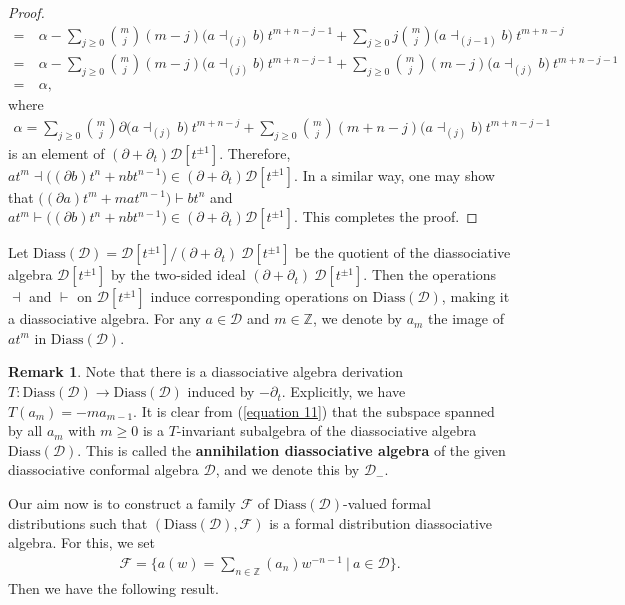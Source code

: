 \documentclass[a4paper,reqno,10pt]{amsart}
\theoremstyle{plain}
\theoremstyle{definition}
\newtheorem{remark}[thm]{Remark}
\theoremstyle{remark}
\newcommand{\Z}{\mathbb{Z}}
\newcommand{\D}{\mathcal{D}}
\newcommand{\p}{\partial}
\begin{document}
\begin{proof}
\begin{align*}
        =&~ \alpha  - \sum_{j \geq 0 } \binom{m}{j}   (m-j) \big(a \dashv_{(j)}  b \big) ~ \! t^{m+n-j-1 } +\sum_{j \geq 0 } j\binom{m}{j}   \big(  a \dashv_{(j-1)} b \big) ~ \! t^{m+n-j }\\
        =&~\alpha  - \sum_{j \geq 0 } \binom{m}{j}   (m-j) \big(a \dashv_{(j)}  b \big) ~ \! t^{m+n-j-1 } +\sum_{j \geq 0 } \binom{m}{j}   (m-j) \big(a \dashv_{(j)}  b \big) ~ \! t^{m+n-j-1 }\\
        =&~ \alpha,
    \end{align*}
    where 
    \begin{align*}
    \alpha = \sum \limits_{j \geq 0 } \binom{m}{j}   \p \big(a \dashv_{(j)}  b \big) ~ \! t^{m+n-j } +\sum \limits_{j \geq 0 } \binom{m}{j}   (m+n-j) \big(a \dashv_{(j)}  b \big) ~ \! t^{m+n-j -1} 
    \end{align*}
    is an element of $(\partial+\partial_t)\D[t^{\pm1}]$. Therefore, $at^m \dashv \big( (\p b)t^n + nbt^{n-1} \big) \in (\partial+\partial_t)\D[t^{\pm1}]$. In a similar way, one may show that $\big(  (\p a)t^{m} + mat^{m-1} \big)\vdash bt^{n} $ and $at^m \vdash \big( (\p b)t^n + nbt^{n-1} \big) \in (\partial+\partial_t)\D[t^{\pm1}]$. This completes the proof.
\end{proof}

Let $\mathrm{Diass} (\D) = \D[t^{\pm1}]\big/(\partial+\partial_t) ~ \! \D[t^{\pm1}]$ be the quotient of the diassociative algebra $ \D[t^{\pm1}]$ by the two-sided ideal $(\partial+\partial_t) ~ \! \D[t^{\pm1}]$.
Then the operations $\dashv$ and $\vdash$ on $\D[t^{\pm1}]$ induce corresponding
operations on $\mathrm{Diass} (\D)$, making it a diassociative algebra. For any $a\in \D$ and $m\in \Z$, we denote by $a_m$ the image of $at^m$ in $\mathrm{Diass} (\D)$. 

\begin{remark}\label{anni-di}
Note that there is a diassociative algebra derivation $T: \mathrm{Diass} (\D) \rightarrow \mathrm{Diass} (\D)$ induced by $-\p_t$. Explicitly, we have $T(a_m)= -ma_{m-1}$. It is clear from (\ref{equation 11}) that the subspace spanned by all $a_m$ with $m \geq 0$ is a $T$-invariant subalgebra of the diassociative algebra $\mathrm{Diass} (\D)$. This is called the {\bf annihilation diassociative algebra} of the given diassociative conformal algebra $\D$, and we denote this by $\D_{-}$. 
\end{remark}

 Our aim now is to construct a family $\mathcal{F}$ of $\mathrm{Diass} (\D)$-valued formal distributions such that $(\mathrm{Diass} (\D), \mathcal{F})$ is a formal distribution diassociative algebra. For this, we set
\begin{align*}
\mathcal{F}
=
\big\{
a(w)=\sum_{n\in\mathbb Z}(a_{n})w^{-n-1} ~ \! \big| ~ \!
a\in \D
\big\}.
\end{align*}
Then we have the following result.
\end{document}
